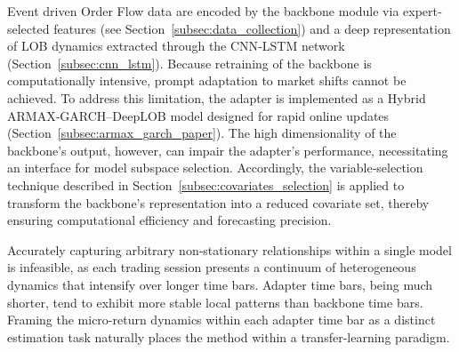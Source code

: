 \documentclass[10pt,a4paper,oneside]{article}
\begin{document}
Event driven Order Flow data are encoded by the backbone module via expert‐selected features (see Section~\ref{subsec:data_collection}) and a deep representation of LOB dynamics extracted through the CNN‐LSTM network (Section~\ref{subsec:cnn_lstm}).  Because retraining of the backbone is computationally intensive, prompt adaptation to market shifts cannot be achieved.  To address this limitation, the adapter is implemented as a Hybrid ARMAX‐GARCH–DeepLOB model designed for rapid online updates (Section~\ref{subsec:armax_garch_paper}).  The high dimensionality of the backbone’s output, however, can impair the adapter’s performance, necessitating an interface for model subspace selection.  Accordingly, the variable‐selection technique described in Section~\ref{subsec:covariates_selection} is applied to transform the backbone’s representation into a reduced covariate set, thereby ensuring computational efficiency and forecasting precision.

Accurately capturing arbitrary non‐stationary relationships within a single model is infeasible, as each trading session presents a continuum of heterogeneous dynamics that intensify over longer time bars. Adapter time bars, being much shorter, tend to exhibit more stable local patterns than backbone time bars. Framing the micro-return dynamics within each adapter time bar as a distinct estimation task naturally places the method within a transfer-learning paradigm.
\end{document}
